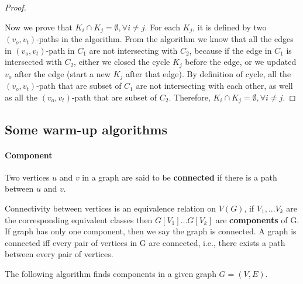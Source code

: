 \begin{proof}
\begin{algorithm}[H]
                        \end{algorithm}
                        Now we prove that $K_i\cap K_j = \emptyset, \forall i \ne j$. For each $K_j$, it is defined by two $(v_o, v_t)$-paths in the algorithm. From the algorithm we know that all the edges in $(v_o, v_t)$-path in $C_1$ are not intersecting with $C_2$, because if the edge in $C_1$ is intersected with $C_2$, either we closed the cycle $K_j$ before the edge, or we updated $v_o$ after the edge (start a new $K_j$ after that edge). By definition of cycle, all the $(v_o, v_t)$-path that are subset of $C_1$ are not intersecting with each other, as well as all the $(v_o, v_t)$-path that are subset of $C_2$. Therefore, $K_i\cap K_j = \emptyset, \forall i \ne j$.
                    \end{proof}

            \subsection{Some warm-up algorithms}
                \paragraph{Component}
                    \begin{definition}
                        Two vertices $u$ and $v$ in a graph are said to be \textbf{connected} if there is a path between $u$ and $v$.
                    \end{definition}

                    \begin{definition}[component]
                        Connectivity between vertices is an equivalence relation on $V(G)$, if $V_1, ... V_k$ are the corresponding equivalent classes then $G[V_1]...G[V_k]$ are \textbf{components} of G. If graph has only one component, then we say the graph is connected. A graph is connected iff every pair of vertices in G are connected, i.e., there exists a path between every pair of vertices.
                    \end{definition}

                    The following algorithm finds components in a given graph $G = (V, E)$.

